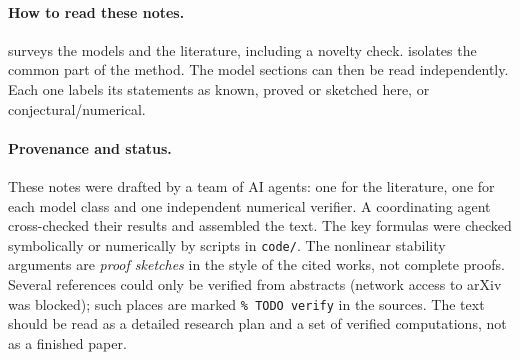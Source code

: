 \paragraph{How to read these notes.}
 surveys the models and the literature, including a novelty
check.  isolates the common part of the method. The model
sections can then be read independently. Each one labels its statements as
known, proved or sketched here, or conjectural/numerical.

\paragraph{Provenance and status.}
These notes were drafted by a team of AI agents: one for the literature, one
for each model class and one independent numerical verifier. A coordinating
agent cross-checked their results and assembled the text. The key formulas
were checked symbolically or numerically by scripts in \texttt{code/}. The
nonlinear stability arguments are \emph{proof sketches} in the style of the
cited works, not complete proofs. Several references could only be verified
from abstracts (network access to arXiv was blocked); such places are marked
\texttt{\%~TODO verify} in the sources. The text should be read as a
detailed research plan and a set of verified computations, not as a
finished paper.
